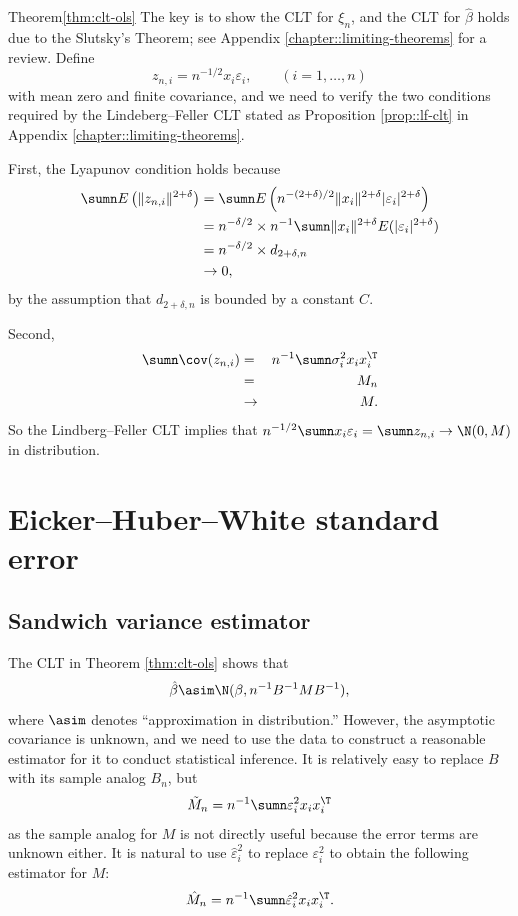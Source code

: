 \begin{myproof}{Theorem}{\ref{thm:clt-ols}}
The key is to show the CLT for $ \xi_n$, and the CLT for $\hat{\beta}$ holds due to the Slutsky's Theorem; see Appendix \ref{chapter::limiting-theorems} for a review. Define 
\[
z_{n,i}=n^{-1/2}x_{i}\varepsilon_{i},\qquad(i=1,\ldots,n)
\]
with mean zero and finite covariance, and we need to verify the two conditions required by the Lindeberg--Feller CLT stated as Proposition \ref{prop::lf-clt} in Appendix \ref{chapter::limiting-theorems}. 

First, the Lyapunov condition holds because
\begin{align*}
\sumn E\left(  \|z_{n,i}\|^{2+\delta} \right) 
& =\sumn E\left(  n^{-(2+\delta)/2}\|x_{i}\|^{2+\delta} | \varepsilon_{i} | ^{2+\delta}  \right)\\
 & =n^{-\delta/2} \times n^{-1}\sumn\|x_{i}\|^{2+\delta}E( | \varepsilon_{i} | ^{2+\delta}) \\
 & =n^{-\delta/2} \times  d_{2+\delta,n} \\
  &\rightarrow 0,
\end{align*}
by the assumption that $d_{2+\delta,n}$ is bounded by a constant $C$. 


Second, 
\begin{eqnarray*}
\sumn\cov(z_{n,i})  &=&  n^{-1}\sumn\sigma_{i}^{2}x_{i}x_{i}^{\T} \\
&=& M_{n} \\
&\rightarrow & M.
\end{eqnarray*}
So the Lindberg--Feller CLT implies that $n^{-1/2}\sumn x_{i}\varepsilon_{i}=\sumn z_{n,i}\rightarrow\N(0,M)$
in distribution. 
\end{myproof}







\section{Eicker--Huber--White standard error}


\subsection{Sandwich variance estimator}
The CLT in Theorem \ref{thm:clt-ols} shows that 
\[
\hat{\beta}\asim\N(\beta,n^{-1}B^{-1}MB^{-1}),
\]
where $\asim$ denotes ``approximation in distribution.'' However,
the asymptotic covariance is unknown, and we need to use the data
to construct a reasonable estimator for it to conduct statistical inference. It is relatively easy to replace $B$ with its sample analog $B_{n}$,
but
\[
\tilde{M}_{n}=n^{-1}\sumn\varepsilon_{i}^{2}x_{i}x_{i}^{\T}
\]
as the sample analog for $M$ is not directly useful because the error
terms are unknown either. It is natural to use $\hat{\varepsilon}_{i}^{2}$
to replace $\varepsilon_{i}^{2}$ to obtain the following estimator
for $M$: 
\[
\hat{M}_{n}=n^{-1}\sumn\hat{\varepsilon}_{i}^{2}x_{i}x_{i}^{\T}.
\]


